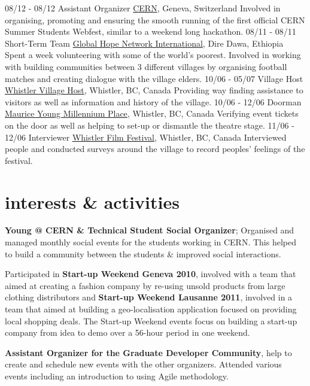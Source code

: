 \documentclass[]{friggeri-cv}
\begin{document}
\begin{entrylist}
  \entry
    {08/12 - 08/12}
    {Assistant Organizer}
    {\href{http://cern.ch}{CERN}, Geneva, Switzerland}
    {Involved in organising, promoting and ensuring the smooth running of the first official CERN Summer Students Webfest, similar to a weekend long hackathon.}
  \entry
    {08/11 - 08/11}
    {Short-Term Team}
    {\href{http://ghni.org}{Global Hope Network International}, Dire Dawa, Ethiopia}
    {Spent a week volunteering with some of the world's poorest. Involved in working with building communities between 3 different villages by organising football matches and creating dialogue with the village elders.}
  \entry
    {10/06 - 05/07}
    {Village Host}
    {\href{http://whistler.ca}{Whistler Village Host}, Whistler, BC, Canada}
    {Providing way finding assistance to visitors as well as information and history of the village.}
  \entry
    {10/06 - 12/06}
    {Doorman}
    {\href{http://www.artswhistler.com}{Maurice Young Millennium Place}, Whistler, BC, Canada}
    {Verifying event tickets on the door as well as helping to set-up or dismantle the theatre stage.}
  \entry
    {11/06 - 12/06}
    {Interviewer}
    {\href{http://whistlerfilmfestival.com}{Whistler Film Festival}, Whistler, BC, Canada}
    {Interviewed people and conducted surveys around the village to record peoples' feelings of the festival.}
\end{entrylist}

\section{interests \& activities}

\textbf{Young @ CERN \& Technical Student Social Organizer}; Organised and managed monthly social events for the students working in CERN. This helped to build a community between the students \& improved social interactions.

Participated in \textbf{Start-up Weekend Geneva 2010}, involved with a team that aimed at creating a fashion company by re-using unsold products from large clothing distributors and \textbf{Start-up Weekend Lausanne 2011}, involved in a team that aimed at building a geo-localisation application focused on providing local shopping deals. The Start-up Weekend events focus on building a start-up company from idea to demo over a 56-hour period in one weekend.

\textbf{Assistant Organizer for the Graduate Developer Community}, help to create and schedule new events with the other organizers. Attended various events including an introduction to using Agile methodology.
\end{document}
